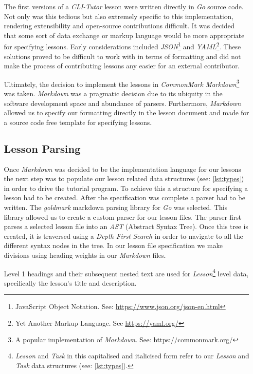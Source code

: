 The first versions of a \textit{CLI-Tutor} lesson were written directly in
\textit{Go} source code. Not only was this tedious but also extremely specific
to this implementation, rendering extensibility and open-source contributions
difficult. It was decided that some sort of data exchange or markup language
would be more appropriate for specifying lessons. Early considerations included
\textit{JSON}\footnote{JavaScript Object Notation. See:
\url{https://www.json.org/json-en.html}} and \textit{YAML}\footnote{Yet Another
Markup Language. See \url{https://yaml.org/}}. These solutions proved to be
difficult to work with in terms of formatting and did not make the process of
contributing lessons any easier for an external contributor.

Ultimately, the decision to implement the lessons in \textit{CommonMark
Markdown}\footnote{A popular implementation of \textit{Markdown}. See:
\url{https://commonmark.org/}} was taken. \textit{Markdown} was a pragmatic
decision due to its ubiquity in the software development space and abundance of
parsers. Furthermore, \textit{Markdown} allowed us to specify our formatting
directly in the lesson document and made for a source code free template for
specifying lessons.

\subsection{Lesson Parsing}
\label{sec:parser}

Once \textit{Markdown} was decided to be the implementation language for our
lessons the next step was to populate our lesson related data structures (see:
\autoref{lst:types}) in order to drive the tutorial program. To achieve this a
structure for specifying a lesson had to be created. After the specification
was complete a parser had to be written. The \textit{goldmark} markdown parsing
library for \textit{Go} was selected. This library allowed us to create a
custom parser for our lesson files. The parser first parses a selected lesson
file into an \textit{AST} (Abstract Syntax Tree). Once this tree is created, it
is traversed using a \textit{Depth First Search} in order to navigate to all
the different syntax nodes in the tree. In our lesson file specification we
make divisions using heading weights in our \textit{Markdown} files. 

Level 1 headings and their subsequent nested text are used for
\textit{Lesson}\footnote{\textit{Lesson} and \textit{Task} in this
capitalised and italicised form refer to our \textit{Lesson} and \textit{Task}
data structures (see: \autoref{lst:types}).} level data, specifically the
lesson's title and description. 


